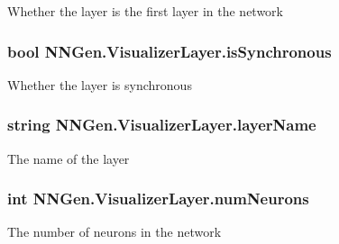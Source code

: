 Whether the layer is the first layer in the network 

\hypertarget{class_n_n_gen_1_1_visualizer_layer_ae0cf894b1f6ca60a8cbcfd3e862763f7}{}
\subsubsection[{is\+Synchronous}]{\setlength{\rightskip}{0pt plus 5cm}bool N\+N\+Gen.\+Visualizer\+Layer.\+is\+Synchronous\hspace{0.3cm}{\ttfamily [get]}}\label{class_n_n_gen_1_1_visualizer_layer_ae0cf894b1f6ca60a8cbcfd3e862763f7}


Whether the layer is synchronous 

\hypertarget{class_n_n_gen_1_1_visualizer_layer_adf0f91a6cf7dd357ff14b44f5c967a5f}{}
\subsubsection[{layer\+Name}]{\setlength{\rightskip}{0pt plus 5cm}string N\+N\+Gen.\+Visualizer\+Layer.\+layer\+Name\hspace{0.3cm}{\ttfamily [get]}}\label{class_n_n_gen_1_1_visualizer_layer_adf0f91a6cf7dd357ff14b44f5c967a5f}


The name of the layer 

\hypertarget{class_n_n_gen_1_1_visualizer_layer_aaf9ed8af2561bf8203a81cba1bf324be}{}
\subsubsection[{num\+Neurons}]{\setlength{\rightskip}{0pt plus 5cm}int N\+N\+Gen.\+Visualizer\+Layer.\+num\+Neurons\hspace{0.3cm}{\ttfamily [get]}}\label{class_n_n_gen_1_1_visualizer_layer_aaf9ed8af2561bf8203a81cba1bf324be}


The number of neurons in the network 

